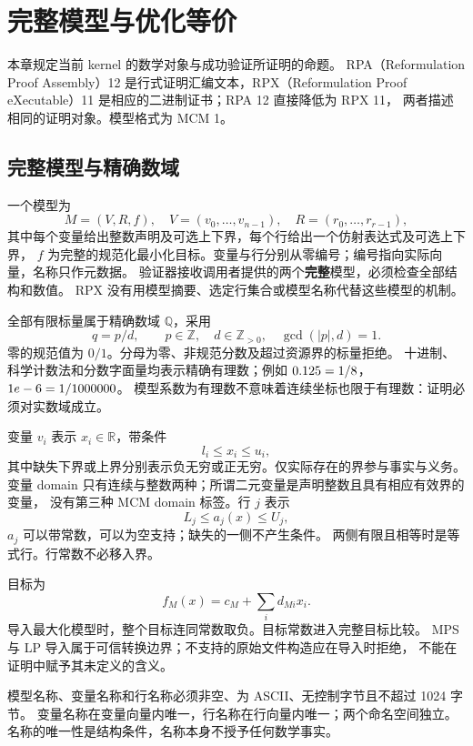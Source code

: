 \chapter{完整模型与优化等价}
\label{ch:model}

本章规定当前 kernel 的数学对象与成功验证所证明的命题。
RPA（Reformulation Proof Assembly）12 是行式证明汇编文本，RPX（Reformulation
Proof eXecutable）11 是相应的二进制证书；RPA 12 直接降低为 RPX 11，
两者描述相同的证明对象。模型格式为 MCM 1。

\section{完整模型与精确数域}
\label{sec:canonical-model}

一个模型为
\[
 M=(V,R,f),\quad V=(v_0,\ldots,v_{n-1}),\quad R=(r_0,\ldots,r_{r-1}),
\]
其中每个变量给出整数声明及可选上下界，每个行给出一个仿射表达式及可选上下界，
$f$ 为完整的规范化最小化目标。变量与行分别从零编号；编号指向实际向量，名称只作元数据。
验证器接收调用者提供的两个\textbf{完整}模型，必须检查全部结构和数值。
RPX 没有用模型摘要、选定行集合或模型名称代替这些模型的机制。

全部有限标量属于精确数域 $\mathbb Q$，采用
\[
 q=p/d,\qquad p\in\mathbb Z,\quad d\in\mathbb Z_{>0},\quad
 \gcd(|p|,d)=1.
\]
零的规范值为 $0/1$。分母为零、非规范分数及超过资源界的标量拒绝。
十进制、科学计数法和分数字面量均表示精确有理数；例如
$0.125=1/8$，$1e-6=1/1000000$。
模型系数为有理数不意味着连续坐标也限于有理数：证明必须对实数域成立。

变量 $v_i$ 表示 $x_i\in\mathbb R$，带条件
\[
 l_i\le x_i\le u_i,
\]
其中缺失下界或上界分别表示负无穷或正无穷。仅实际存在的界参与事实与义务。
变量 domain 只有连续与整数两种；所谓二元变量是声明整数且具有相应有效界的变量，
没有第三种 MCM domain 标签。行 $j$ 表示
\[
 L_j\le a_j(x)\le U_j,
\]
$a_j$ 可以带常数，可以为空支持；缺失的一侧不产生条件。
两侧有限且相等时是等式行。行常数不必移入界。

目标为
\[
 f_M(x)=c_M+\sum_i d_{Mi}x_i.
\]
导入最大化模型时，整个目标连同常数取负。目标常数进入完整目标比较。
MPS 与 LP 导入属于可信转换边界；不支持的原始文件构造应在导入时拒绝，
不能在证明中赋予其未定义的含义。

模型名称、变量名称和行名称必须非空、为 ASCII、无控制字节且不超过 1024 字节。
变量名称在变量向量内唯一，行名称在行向量内唯一；两个命名空间独立。
名称的唯一性是结构条件，名称本身不授予任何数学事实。

